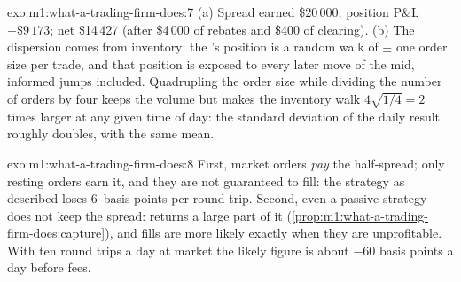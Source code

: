 \begin{solution}{exo:m1:what-a-trading-firm-does:7}
(a) Spread earned \$20\,000; position P\&L $-\$9\,173$; net \$14\,427 (after
\$4\,000 of rebates and \$400 of clearing). (b) The dispersion comes from
inventory: the 's position is a random walk of $\pm$ one order
size per trade, and that position is exposed to every later move of the mid,
informed jumps included. Quadrupling the order size while dividing the number
of orders by four keeps the volume but makes the inventory walk
$4\sqrt{1/4} = 2$ times larger at any given time of day: the standard
deviation of the daily result roughly doubles, with the same mean.
\end{solution}

\begin{solution}{exo:m1:what-a-trading-firm-does:8}
First, market orders \emph{pay} the half-spread; only resting orders earn it,
and they are not guaranteed to fill: the strategy as described loses 6~basis
points per round trip. Second, even a passive strategy does not keep the
spread:  returns a large part of it
(\cref{prop:m1:what-a-trading-firm-does:capture}), and fills are more likely
exactly when they are unprofitable. With ten round trips a day at market the
likely figure is about $-60$ basis points a day before fees.
\end{solution}

